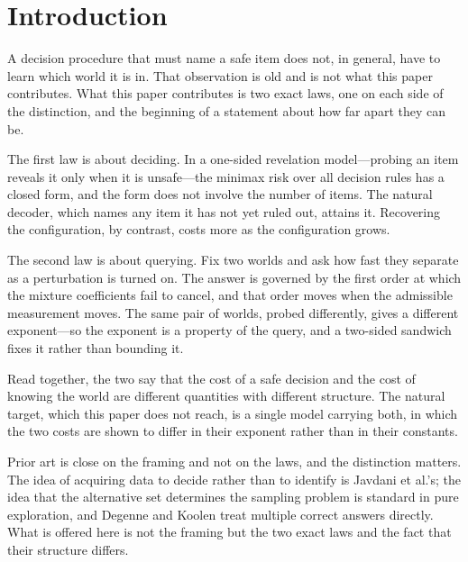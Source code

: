\section{Introduction}

A decision procedure that must name a safe item does not, in general, have to learn which
world it is in. That observation is old and is not what this paper contributes. What this
paper contributes is two exact laws, one on each side of the distinction, and the beginning
of a statement about how far apart they can be.

The first law is about deciding. In a one-sided revelation model---probing an item reveals it
only when it is unsafe---the minimax risk over all decision rules has a closed form, and the
form does not involve the number of items. The natural decoder, which names any item it has
not yet ruled out, attains it. Recovering the configuration, by contrast, costs more as the
configuration grows.

The second law is about querying. Fix two worlds and ask how fast they separate as a
perturbation is turned on. The answer is governed by the first order at which the mixture
coefficients fail to cancel, and that order moves when the admissible measurement moves. The
same pair of worlds, probed differently, gives a different exponent---so the exponent is a
property of the query, and a two-sided sandwich fixes it rather than bounding it.

Read together, the two say that the cost of a safe decision and the cost of knowing the world
are different quantities with different structure. The natural target, which this paper does
not reach, is a single model carrying both, in which the two costs are shown to differ in
their exponent rather than in their constants.

Prior art is close on the framing and not on the laws, and the distinction matters. The idea
of acquiring data to decide rather than to identify is Javdani et al.'s; the idea that the
alternative set determines the sampling problem is standard in pure exploration, and Degenne
and Koolen treat multiple correct answers directly. What is offered here is not the framing
but the two exact laws and the fact that their structure differs.


